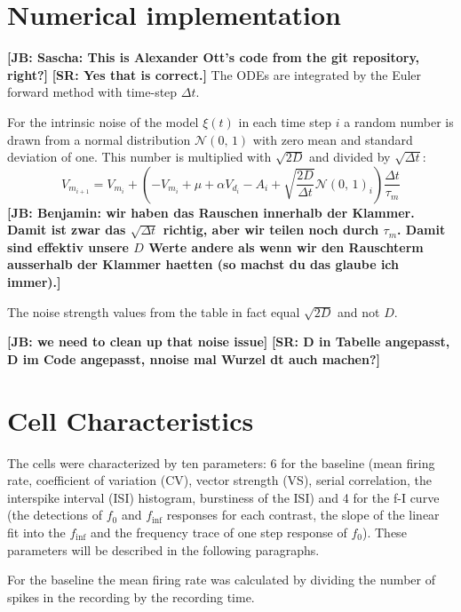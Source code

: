 \documentclass[12pt,a4paper]{article}
\newcommand{\note}[2][]{\textbf{[#1: #2]}}
\begin{document}
\section{Numerical implementation}




\note[JB]{Sascha: This is Alexander Ott's code from the git repository, right?}
\note[SR]{Yes that is correct.}
The ODEs are integrated by the Euler forward method with time-step $\Delta t$.

For the intrinsic noise of the model $\xi(t)$ in each time step $i$ a random number is drawn from a normal distribution $\mathcal{N}(0,\,1)$ with zero mean and standard deviation of one. This number is multiplied with $\sqrt{2D}$ and divided by $\sqrt{\Delta t}$:
\begin{equation}
  \label{LIFintegration}
  V_{m_{i+1}}  = V_{m_i} + \left(-V_{m_i} + \mu + \alpha V_{d_i} - A_i + \sqrt{\frac{2D}{\Delta t}}\mathcal{N}(0,\,1)_i\right) \frac{\Delta t}{\tau_m}
\end{equation}
\note[JB]{Benjamin: wir haben das Rauschen innerhalb der Klammer. Damit ist zwar das $\sqrt{\Delta t}$ richtig, aber wir teilen noch durch $\tau_m$. Damit sind effektiv unsere $D$ Werte andere als wenn wir den Rauschterm ausserhalb der Klammer haetten (so machst du das glaube ich immer).}

The noise strength values from the table in fact equal $\sqrt{2D}$ and not $D$.



\note[JB]{we need to clean up that noise issue}
\note[SR]{D in Tabelle angepasst, D im Code angepasst, nnoise mal Wurzel dt auch machen?}



\section{Cell Characteristics}
The cells were characterized by ten parameters: 6 for the baseline (mean firing rate, coefficient of variation (CV), vector strength (VS), serial correlation, the interspike interval (ISI) histogram, burstiness of the ISI) and 4 for the f-I curve (the detections of $f_{0}$ and $f_{\inf}$ responses for each contrast, the slope of the linear fit into the $f_{\inf}$ and the frequency trace of one
step response of $f_{0}$). These parameters will be described in the following paragraphs.


For the baseline the mean firing rate was calculated by dividing the number of spikes in the recording by the recording time.
\end{document}
